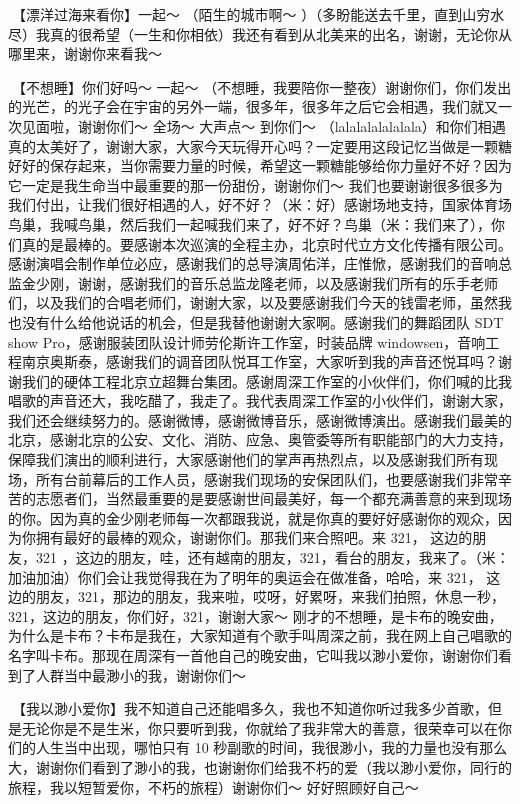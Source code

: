 \documentclass[
]{book}
\begin{document}
🎵【漂洋过海来看你】一起～ （陌生的城市啊～ ）（多盼能送去千里，直到山穷水尽）我真的很希望（一生和你相依）我还有看到从北美来的出名，谢谢，无论你从哪里来，谢谢你来看我～

🎵【不想睡】你们好吗～ 一起～ （不想睡，我要陪你一整夜）谢谢你们，你们发出的光芒，的光子会在宇宙的另外一端，很多年，很多年之后它会相遇，我们就又一次见面啦，谢谢你们～ 全场～ 大声点～ 到你们～ （lalalalalalalala）和你们相遇真的太美好了，谢谢大家，大家今天玩得开心吗？一定要用这段记忆当做是一颗糖好好的保存起来，当你需要力量的时候，希望这一颗糖能够给你力量好不好？因为它一定是我生命当中最重要的那一份甜份，谢谢你们～
我们也要谢谢很多很多为我们付出，让我们很好相遇的人，好不好？（米：好）感谢场地支持，国家体育场鸟巢，我喊鸟巢，然后我们一起喊我们来了，好不好？鸟巢（米：我们来了），你们真的是最棒的。要感谢本次巡演的全程主办，北京时代立方文化传播有限公司。感谢演唱会制作单位必应，感谢我们的总导演周佑洋，庄惟惞，感谢我们的音响总监金少刚，谢谢，感谢我们的音乐总监龙隆老师，以及感谢我们所有的乐手老师们，以及我们的合唱老师们，谢谢大家，以及要感谢我们今天的钱雷老师，虽然我也没有什么给他说话的机会，但是我替他谢谢大家啊。感谢我们的舞蹈团队 SDT show Pro，感谢服装团队设计师劳伦斯许工作室，时装品牌 windowsen，音响工程南京奥斯泰，感谢我们的调音团队悦耳工作室，大家听到我的声音还悦耳吗？谢谢我们的硬体工程北京立超舞台集团。感谢周深工作室的小伙伴们，你们喊的比我唱歌的声音还大，我吃醋了，我走了。我代表周深工作室的小伙伴们，谢谢大家，我们还会继续努力的。感谢微博，感谢微博音乐，感谢微博演出。感谢我们最美的北京，感谢北京的公安、文化、消防、应急、奥管委等所有职能部门的大力支持，保障我们演出的顺利进行，大家感谢他们的掌声再热烈点，以及感谢我们所有现场，所有台前幕后的工作人员，感谢我们现场的安保团队们，也要感谢我们非常辛苦的志愿者们，当然最重要的是要感谢世间最美好，每一个都充满善意的来到现场的你。因为真的金少刚老师每一次都跟我说，就是你真的要好好感谢你的观众，因为你拥有最好的最棒的观众，谢谢你们。那我们来合照吧。来 321， 这边的朋友，321 ，这边的朋友，哇，还有越南的朋友，321，看台的朋友，我来了。（米：加油加油）你们会让我觉得我在为了明年的奥运会在做准备，哈哈，来 321， 这边的朋友，321，那边的朋友，我来啦，哎呀，好累呀，来我们拍照，休息一秒，321，这边的朋友，你们好，321，谢谢大家～
刚才的不想睡，是卡布的晚安曲，为什么是卡布？卡布是我在，大家知道有个歌手叫周深之前，我在网上自己唱歌的名字叫卡布。那现在周深有一首他自己的晚安曲，它叫我以渺小爱你，谢谢你们看到了人群当中最渺小的我，谢谢你们～

🎵【我以渺小爱你】我不知道自己还能唱多久，我也不知道你听过我多少首歌，但是无论你是不是生米，你只要听到我，你就给了我非常大的善意，很荣幸可以在你们的人生当中出现，哪怕只有 10 秒副歌的时间，我很渺小，我的力量也没有那么大，谢谢你们看到了渺小的我，也谢谢你们给我不朽的爱（我以渺小爱你，同行的旅程，我以短暂爱你，不朽的旅程）谢谢你们～ 好好照顾好自己～
\end{document}
